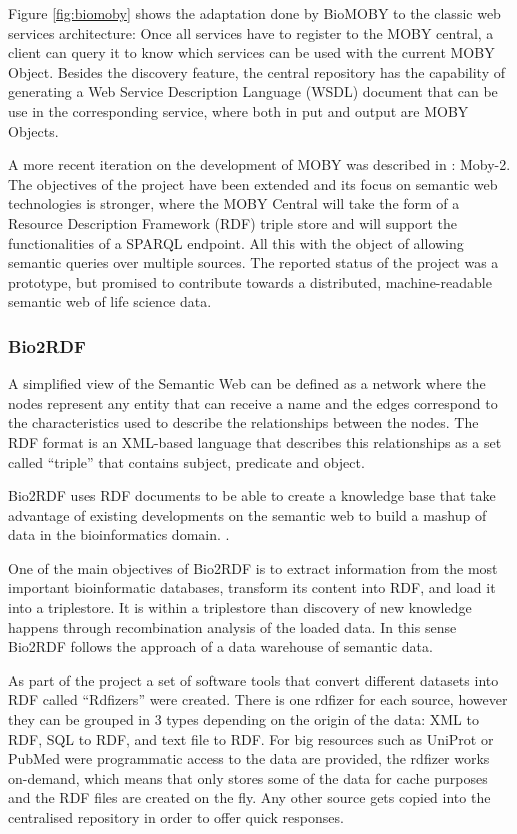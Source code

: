 Figure \ref{fig:biomoby} shows the adaptation done by BioMOBY to the classic web services architecture: Once all services have to register to the MOBY central, a client can query it to know which services can be used with the current MOBY Object. Besides the discovery feature, the central repository has the capability of generating a Web Service Description Language (WSDL) document that can be use in the corresponding service, where both in put and output are MOBY Objects.

A more recent iteration on the development of MOBY was described in \cite{VAN2009}: Moby-2. The objectives of the project have been extended and its focus on semantic web technologies is stronger, where the MOBY Central will take the form of a Resource Description Framework (RDF) triple store and will support the functionalities of a SPARQL endpoint. All this with the object of allowing semantic queries over multiple sources. The reported status of the project was a prototype, but promised to contribute towards a distributed, machine-readable semantic web of life science data.

\subsubsection{Bio2RDF}
A simplified view of the Semantic Web can be defined as a network where the nodes represent any entity that can receive a name and the edges correspond to the characteristics used to describe the relationships between the nodes. The RDF format is an XML-based language that describes this relationships as a set called ``triple'' that contains subject, predicate and object.

Bio2RDF uses RDF documents to be able to create a knowledge base that take advantage of existing developments on the semantic web to build a mashup of data in the bioinformatics domain.  \cite{BEL2008}.

One of the main objectives of Bio2RDF is to extract information from the most important bioinformatic databases, transform its content into RDF, and load it into a triplestore. It is within a triplestore than discovery of new knowledge happens through recombination analysis of the loaded data. In this sense Bio2RDF follows the approach of a data warehouse of semantic data.

As part of the project a set of software tools that convert different datasets into RDF called ``Rdfizers'' were created. There is one rdfizer for each source, however they can be grouped in 3 types depending on the origin of the data: XML to RDF, SQL to RDF, and text file to RDF. For big resources such as UniProt or PubMed were programmatic access to the data are provided, the rdfizer works on-demand, which means that only stores some of the data for cache purposes and the RDF files are created on the fly. Any other source gets copied into the centralised repository in order to offer quick responses.

